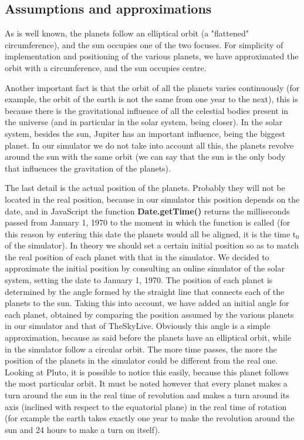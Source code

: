 \documentclass{article}
\begin{document}
\subsection{Assumptions and approximations}
As is well known, the planets follow an elliptical orbit (a "flattened" circumference), and the sun occupies one of the two focuses. For simplicity of implementation and positioning of the various planets, we have approximated the orbit with a circumference, and the sun occupies  centre. \newline
\par Another important fact is that the orbit of all the planets varies continuously (for example, the orbit of the earth is not the same from one year to the next), this is because there is the gravitational influence of all the celestial bodies present in the universe (and in particular in the solar system, being closer). In the solar system, besides the sun, Jupiter has an important influence, being the biggest planet. In our simulator we do not take into account all this, the planets revolve around the sun with the same orbit (we can say that the sun is the only body that influences the gravitation of the planets). \newline
\par The last detail is the actual position of the planets. Probably they will not be located in the real position, because in our simulator this position depends on the date, and in JavaScript the function \textbf{Date.getTime()} returns the milliseconds passed from January 1, 1970 to the moment in which the function is called (for this reason by entering this date the planets would all be aligned, it is the time t$_0$ of the simulator). In theory we should set a certain initial position so as to match the real position of each planet with that in the simulator. 
We decided to approximate the initial position by consulting an online simulator of the solar system\cite{solarsystemrealpositon}, setting the date to January 1, 1970. The position of each planet is determined by the angle formed by the straight line that connects each of the planets to the sun. Taking this into account, we have added an initial angle for each planet, obtained by comparing the position assumed by the various planets in our simulator and that of TheSkyLive. Obviously this angle is a simple approximation, because as said before the planets have an elliptical orbit, while in the simulator follow a circular orbit. The more time passes, the more the position of the planets in the simulator could be different from the real one. Looking at Pluto, it is possible to notice this easily, because this planet follows the most particular orbit.
It must be noted however that every planet makes a turn around the sun in the real time of revolution and makes a turn around its axis (inclined with respect to the equatorial plane) in the real time of rotation (for example the earth takes exactly one year to make the revolution around the sun and 24 hours to make a turn on itself).
\end{document}
